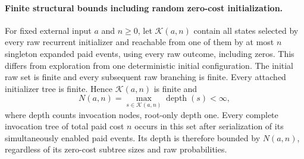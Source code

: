 \documentclass[11pt]{article}
\begin{document}
\paragraph{Finite structural bounds including random zero-cost initialization.}
For fixed external input $a$ and $n\geq0$, let $\mathcal K(a,n)$ contain
all states selected by every raw recurrent initializer and reachable from
one of them by at most $n$ singleton expanded paid events, using every raw
outcome, including zeros. This differs from exploration from one deterministic
initial configuration. The initial raw set is finite and every subsequent
raw branching is finite. Every attached initializer tree is finite. Hence
$\mathcal K(a,n)$ is finite and
\[
 N(a,n)=\max_{s\in\mathcal K(a,n)}\operatorname{depth}(s)<\infty,
\]
where depth counts invocation nodes, root-only depth one. Every complete
invocation tree of total paid cost $n$ occurs in this set after serialization
of its simultaneously enabled paid events. Its depth is therefore bounded
by $N(a,n)$, regardless of its zero-cost subtree sizes and raw probabilities.
\end{document}
